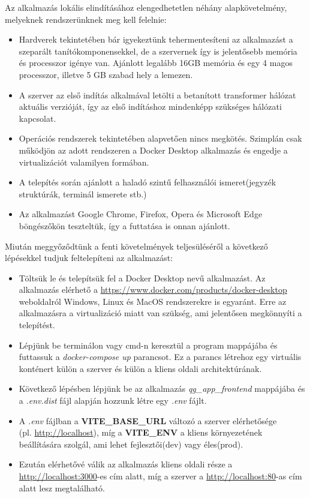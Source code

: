 Az alkalmazás lokális elindításához elengedhetetlen néhány alapkövetelmény, melyeknek rendszerünknek meg kell felelnie:

\begin{itemize}
\item Hardverek tekintetében bár igyekeztünk tehermentesíteni az alkalmazást a szeparált tanítókomponensekkel, de a szervernek így is jelentősebb memória és processzor igénye van. Ajánlott legalább 16GB memória és egy 4 magos processzor, illetve 5 GB szabad hely a lemezen.
\item A szerver az első indítás alkalmával letölti a betanított transformer hálózat aktuális verzióját, így az első indításhoz mindenképp szükséges hálózati kapcsolat.
\item Operációs rendszerek tekintetében alapvetően nincs megkötés. Szimplán csak működjön az adott rendszeren a Docker Desktop alkalmazás és engedje a virtualizációt valamilyen formában.
\item A telepítés során ajánlott a haladó szintű felhasználói ismeret(jegyzék struktúrák, terminál ismerete stb.)
\item Az alkalmazást Google Chrome, Firefox, Opera és Microsoft Edge böngészőkön teszteltük, így a futtatása is onnan ajánlott.
\end{itemize}

Miután meggyőződtünk a fenti követelmények teljesüléséről a következő lépésekkel tudjuk feltelepíteni az alkalmazást:

\begin{itemize}
\item Töltsük le és telepítsük fel a Docker Desktop nevű alkalmazást. Az alkalmazás elérhető a \url{https://www.docker.com/products/docker-desktop} weboldalról Windows, Linux és MacOS rendszerekre is egyaránt. Erre az alkalmazásra a virtualizáció miatt van szükség, ami jelentősen megkönnyíti a telepítést.
\item Lépjünk be terminálon vagy cmd-n keresztül a program mappájába és futtassuk a \textit{docker-compose up} parancsot. Ez a parancs létrehoz egy virtuális konténert külön a szerver és külön a kliens oldali architektúrának.
\item Következő lépésben lépjünk be az alkalmazás \textit{qg\_app\_frontend} mappájába és a \textit{.env.dist} fájl alapján hozzunk létre egy \textit{.env} fájlt.
\item A \textit{.env} fájlban a \textbf{VITE\_BASE\_URL} változó a szerver elérhetősége \\
(pl. \url{http://localhost}), míg a \textbf{VITE\_ENV} a kliens környezetének beállítására szolgál, ami lehet fejlesztői(dev) vagy éles(prod).
\item Ezután elérhetővé válik az alkalmazás kliens oldali része a \url{http://localhost:3000}-es cím alatt, míg a szerver a \url{http://localhost:80}-as cím alatt lesz megtalálható.
\end{itemize}


